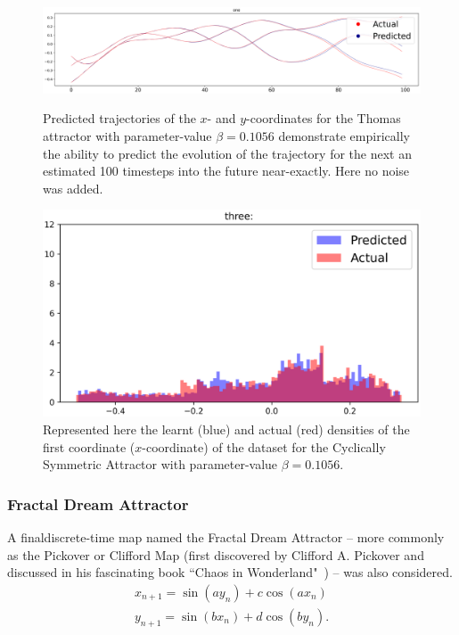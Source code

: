 \begin{figure}[ht]
  \centering
  \includegraphics[scale=0.35]{Graphs/_Thomas_1.eps}\caption*{Predicted trajectories of the $x$- and $y$-coordinates for the Thomas attractor with parameter-value $\beta=0.1056$ demonstrate empirically the ability to predict the evolution of the trajectory for the next an estimated 100 timesteps into the future near-exactly. Here no noise was added.}
  \includegraphics[scale=0.5]{Graphs/_Thomas_3.eps}\caption*{Represented here the learnt (blue) and actual (red) densities of the first coordinate ($x$-coordinate) of the dataset for the Cyclically Symmetric Attractor with parameter-value $\beta=0.1056$.}
\end{figure}\label{fig:Thomas_TrajDensity}


\subsubsection{Fractal Dream Attractor}

A finaldiscrete-time map named the Fractal Dream Attractor -- more commonly as the Pickover or Clifford Map (first discovered by Clifford A. Pickover and discussed in his fascinating book ``Chaos in Wonderland"~\cite{PickoverChaos}) -- was also considered.
\begin{eqnarray}\label{eqns_clifford}
  {x_{n+1}=\sin(ay_n) + c\cos(ax_n)} \\
  {y_{n+1}=\sin(bx_n)+d\cos(by_n)}.
\end{eqnarray}


